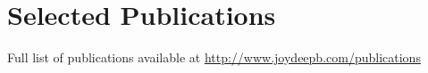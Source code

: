 \documentclass[Times]{article}
\begin{document}
\section*{Selected Publications}
Full list of publications available at \href{http://www.joydeepb.com/publications}{http://www.joydeepb.com/publications}

\begin{refsection}
\nocite{basich2023competence}
\nocite{rabiee2023introspective}
\nocite{rabiee2022cpip}
\nocite{rabiee2020ivslam}
\nocite{zhang2023robust}
\nocite{xin2023plunder}
\nocite{wei2022steady}
\nocite{holtz2021idips}
\nocite{holtz2020ldips}
\nocite{holtz2018interactive}
\printbibliography[heading=none] %
\end{refsection}
\end{document}
